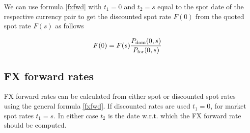 \documentclass{amsart}
\theoremstyle{plain}
\numberwithin{equation}{section}
\begin{document}
We can use formula \ref{fxfwd} with $t_1=0$ and $t_2=s$ equal to the spot date of the respective currency pair to get the discounted spot rate $F(0)$ from the quoted spot rate $F(s)$ as follows

\begin{equation}
F(0) = F(s) \frac{P_\textnormal{dom}(0,s)}{P_\textnormal{for}(0,s)}
\end{equation}

\subsection{FX forward rates}

FX forward rates can be calculated from either spot or discounted spot rates using the general formula \ref{fxfwd}. If discounted rates are used $t_1=0$, for market spot rates $t_1=s$. In either case $t_2$ is the date w.r.t. which the FX forward rate should be computed.
\end{document}
